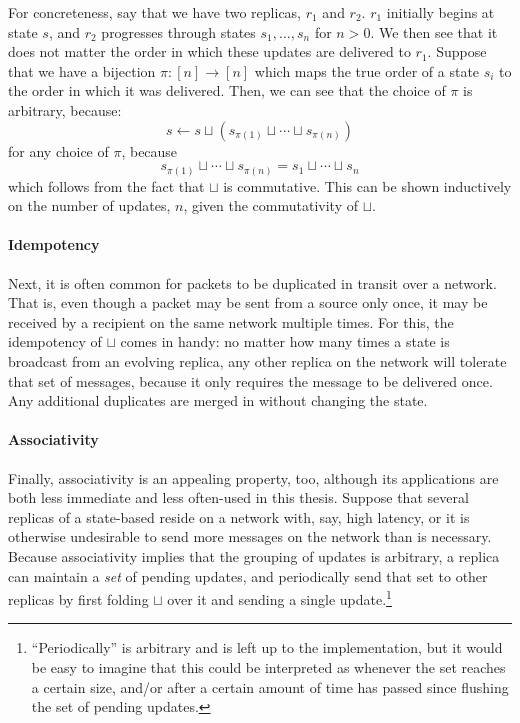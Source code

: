 For concreteness, say that we have two replicas, $r_1$ and $r_2$. $r_1$
initially begins at state $s$, and $r_2$ progresses through states $s_1, \ldots,
s_n$ for $n > 0$. We then see that it does not matter the order in which these
updates are delivered to $r_1$. Suppose that we have a bijection $\pi : [n] \to
[n]$ which maps the true order of a state $s_i$ to the order in which it was
delivered. Then, we can see that the choice of $\pi$ is arbitrary, because:
\[
  s \gets s \sqcup (s_{\pi(1)} \sqcup \cdots \sqcup s_{\pi(n)})
\]
for any choice of $\pi$, because
\[
  s_{\pi(1)} \sqcup \cdots \sqcup s_{\pi(n)} = s_1 \sqcup \cdots \sqcup s_n
\]
which follows from the fact that $\sqcup$ is commutative. This can be shown
inductively on the number of updates, $n$, given the commutativity of $\sqcup$.

\paragraph{Idempotency} Next, it is often common for packets to be duplicated in
transit over a network.  That is, even though a packet may be sent from a source
only once, it may be received by a recipient on the same network multiple times.
For this, the idempotency of $\sqcup$ comes in handy: no matter how many times a
state is broadcast from an evolving replica, any other replica on the network
will tolerate that set of messages, because it only requires the message to be
delivered once. Any additional duplicates are merged in without changing the
state.

\paragraph{Associativity} Finally, associativity is an appealing property, too,
although its applications are both less immediate and less often-used in this
thesis. Suppose that several replicas of a state-based \CRDT reside on a network
with, say, high latency, or it is otherwise undesirable to send more messages on
the network than is necessary. Because associativity implies that the grouping
of updates is arbitrary, a replica can maintain a \textit{set} of pending
updates, and periodically send that set to other replicas by first folding
$\sqcup$ over it and sending a single update.\footnote{``Periodically'' is
arbitrary and is left up to the implementation, but it would be easy to imagine
that this could be interpreted as whenever the set reaches a certain size,
and/or after a certain amount of time has passed since flushing the set of
pending updates.}

